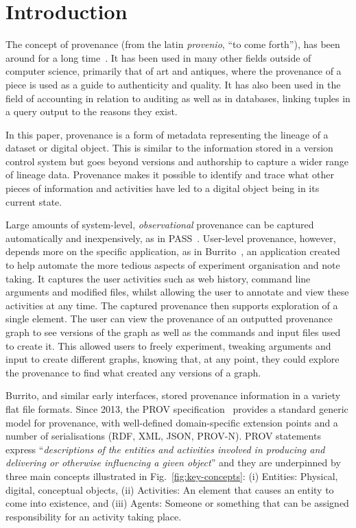 \chapter{Introduction}
The concept of provenance (from the latin \textit{provenio}, ``to
come forth''), has been around for a long time~\cite{Bearman1985}.
It has been used in many other fields outside of computer science,
primarily that of art and antiques, where the provenance of a piece
is used as a guide to authenticity and quality. It has also been
used in the field of accounting in relation to auditing as well as
in databases, linking tuples in a query output to the reasons they
exist.

In this paper, provenance is a form of metadata representing the
lineage of a dataset or digital object. This is similar to the
information stored in a version control system but
goes beyond versions and authorship 
to capture a wider range of lineage data. 
Provenance makes it possible to identify and trace what other pieces
of information and activities have led to a digital object being in its
current state.

Large amounts of system-level, \textit{observational} provenance can be captured automatically and inexpensively, as in PASS~\cite{Macko2011,180755}. 
User-level provenance, however, depends more on the specific application,
as in Burrito~\cite{Guo2012}, an application created to help automate the more tedious aspects of experiment organisation and note taking. It captures the user activities such as web history, command line arguments and modified files, whilst allowing the user to annotate and view these activities at any time. The captured provenance then supports exploration of a single element. The user can view the provenance of an outputted provenance graph to see versions of the graph as well as the commands and input files used to create it. This allowed users to freely experiment, tweaking arguments and input to create different graphs, knowing that, at any point, they could explore the provenance to find what created any versions of a graph.

Burrito, and similar early interfaces, stored provenance information in a variety flat file formats. Since 2013, the PROV specification~\cite{primer2013} provides a standard generic model for provenance, with well-defined domain-specific extension points and a number of serialisations (RDF, XML, JSON, PROV-N).
%
PROV statements express ``\emph{descriptions of the entities and activities involved in producing and delivering or otherwise influencing a given object}'' and they are underpinned by three main concepts illustrated in Fig.~\ref{fig:key-concepts}:
(i) Entities: Physical, digital, conceptual objects, (ii) Activities: An element that causes an entity to come into existence, and (iii) Agents: Someone or something that can be assigned responsibility for an activity taking place.


